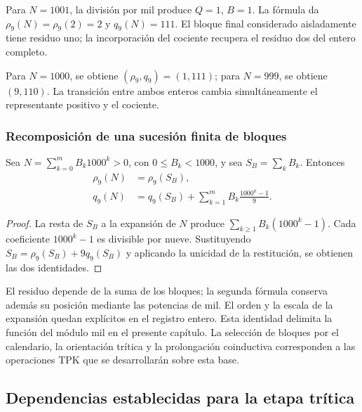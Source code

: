 \begin{ejemplo}
Para $N=1001$, la división por mil produce $Q=1$, $B=1$. La fórmula da $\rho_9(N)=\rho_9(2)=2$ y $q_9(N)=111$. El bloque final considerado aisladamente tiene residuo uno; la incorporación del cociente recupera el residuo dos del entero completo.

Para $N=1000$, se obtiene $(\rho_9,q_9)=(1,111)$; para $N=999$, se obtiene $(9,110)$. La transición entre ambos enteros cambia simultáneamente el representante positivo y el cociente.
\end{ejemplo}

\subsubsection{Recomposición de una sucesión finita de bloques}

\begin{bloqueindivisible}
\begin{corolario}
\label{cor:app-bloques}
Sea $N=\sum_{k=0}^{m}B_k1000^k>0$, con $0\leq B_k<1000$, y sea $S_B=\sum_kB_k$. Entonces
\begin{align}
 \rho_9(N)&=\rho_9(S_B),\\
 q_9(N)&=q_9(S_B)+
 \sum_{k=1}^{m}B_k\frac{1000^k-1}{9}.
 \label{eq:app-blocks-complete}
\end{align}
\end{corolario}

\begin{proof}
La resta de $S_B$ a la expansión de $N$ produce $\sum_{k\geq1}B_k(1000^k-1)$. Cada coeficiente $1000^k-1$ es divisible por nueve. Sustituyendo $S_B=\rho_9(S_B)+9q_9(S_B)$ y aplicando la unicidad de la restitución, se obtienen las dos identidades.
\end{proof}
\end{bloqueindivisible}

El residuo depende de la suma de los bloques; la segunda fórmula conserva además su posición mediante las potencias de mil. El orden y la escala de la expansión quedan explícitos en el registro entero. Esta identidad delimita la función del módulo mil en el presente capítulo. La selección de bloques por el calendario, la orientación trítica y la prolongación coinductiva corresponden a las operaciones TPK que se desarrollarán sobre esta base.

\subsection{Dependencias establecidas para la etapa trítica}
\label{sec:app-dependencias}

